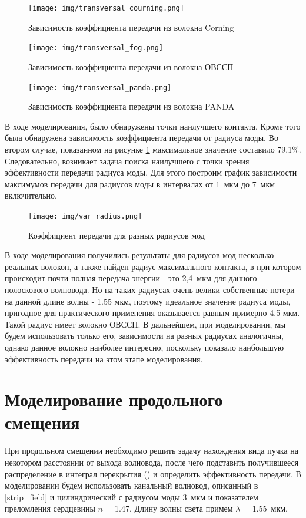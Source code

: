 \begin{figure}[h!]
		\texttt{[image: img/transversal\_courning.png]}
		\caption{Зависимость коэффициента передачи из волокна Corning}
\end{figure}
\begin{figure}[h!]
		\texttt{[image: img/transversal\_fog.png]}
		\caption{Зависимость коэффициента передачи из волокна ОВССП}
		\label{transversal_fog}
\end{figure}
\begin{figure}[h!]
		\texttt{[image: img/transversal\_panda.png]}
		\caption{Зависимость коэффициента передачи из волокна PANDA}
		\label{transversal_panda}
\end{figure}

В ходе моделирования, было обнаружены точки наилучшего контакта. Кроме того была обнаружена зависимость коэффициента передачи от радиуса моды. Во втором случае, показанном на рисунке \ref{transversal_fog} максимальное значение составило 79,1\%. Следовательно, возникает задача поиска наилучшего с точки зрения эффективности передачи радиуса моды. Для этого построим график зависимости максимумов передачи для радиусов моды в интервалах от 1~мкм до 7~мкм включительно.
\begin{figure}[h!]
		\texttt{[image: img/var\_radius.png]}
		\caption{Коэффициент передачи для разных радиусов мод}
\end{figure}

В ходе моделирования получились результаты для радиусов мод несколько реальных волокон, а также найден радиус максимального контакта, в при котором происходит почти полная передача энергии - это 2,4~мкм для данного полоскового волновода. Но на таких радиусах очень велики собственные потери на данной длине волны - 1.55 мкм, поэтому идеальное значение радиуса моды, пригодное для практического применения оказывается равным примерно 4.5 мкм. Такой радиус имеет волокно ОВССП. В дальнейшем, при моделировании, мы будем использовать только его, зависимости на разных радиусах аналогичны, однако данное волокно наиболее интересно, поскольку показало наибольшую эффективность передачи на этом этапе моделирования.

\section{Моделирование продольного смещения}

При продольном смещении необходимо решить задачу нахождения вида пучка на некотором расстоянии от выхода волновода, после чего подставить получившееся распределение в интеграл перекрытия (\label{coupling_natural}) и определить эффективность передачи.
В моделировании будем использовать канальный волновод, описанный в \ref{strip_field} и цилиндрический с радиусом моды 3~мкм и показателем преломления сердцевины $n$ = 1.47. Длину волны света примем $\lambda$ = 1.55~мкм.

